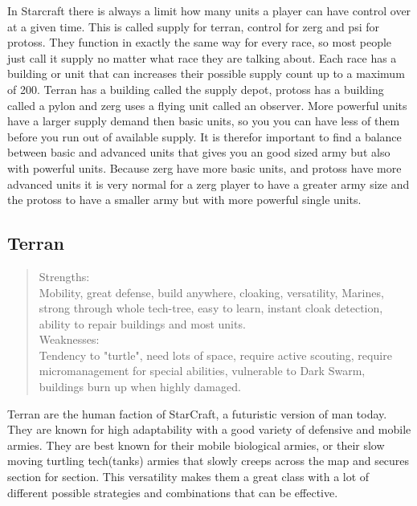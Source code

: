 In Starcraft there is always a limit how many units a player can have control over at a given time. This is called supply for terran, control for zerg and psi for protoss. They function in exactly the same way for every race, so most people just call it supply no matter what race they are talking about. Each race has a building or unit that can increases their possible supply count up to a maximum of 200. Terran has a building called the supply depot, protoss has a building called a pylon and zerg uses a flying unit called an observer. More powerful units have a larger supply demand then basic units, so you you can have less of them before you run out of available supply. It is therefor important to find a balance between basic and advanced units that gives you an good sized army but also with powerful units. Because zerg have more basic units, and protoss have more advanced units it is very normal for a zerg player to have a greater army size and the protoss to have a smaller army but with more powerful single units. 

\subsection{Terran}

\begin{quote}
Strengths: \\
Mobility, great defense, build anywhere, cloaking, versatility, Marines, strong through whole tech-tree, easy to learn, instant cloak detection, ability to repair buildings and most units. \\
Weaknesses: \\
Tendency to "turtle", need lots of space, require active scouting, require micromanagement for special abilities, vulnerable to Dark Swarm, buildings burn up when highly damaged. 


\cite{terranoverview}
\end{quote}

Terran are the human faction of StarCraft, a futuristic version of man today. They are known for high adaptability with a good variety of defensive and mobile armies. They are best known for their mobile biological armies, or their slow moving turtling tech(tanks) armies that slowly creeps across the map and secures section for section. This versatility makes them a great class with a lot of different possible strategies and combinations that can be effective. 


